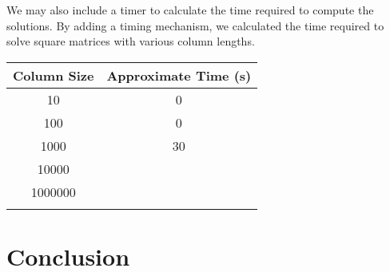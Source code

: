 \documentclass[10pt,showpacs,preprintnumbers,footinbib,amsmath,amssymb,aps,prl,twocolumn,groupedaddress,superscriptaddress,showkeys]{revtex4-1}
\begin{document}
	We may also include a timer to calculate the time required to compute the solutions.  By adding a timing mechanism, we calculated the time required to solve square matrices with various column lengths.
	
	\begin{center}
		\begin{tabular}{cc}
			\hline \hline
			Column Size & Approximate Time (s)\\
			\hline
			10 & 0\\
			100 & 0\\
			1000 & 30\\
			10000 & \\
			1000000 & \\
			\hline
			\label{timingtable}
		\end{tabular}
	\end{center}
	
	
	
	\section*{Conclusion}
	
	
	
	
	
	
	
	
	
	
	
	
	
	
\end{document}

